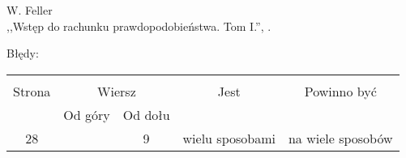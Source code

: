 \documentclass[a4paper,11pt]{article}
\begin{document}


\begin{center}
  W. Feller \\
  ,,Wstęp do rachunku prawdopodobieństwa. Tom I.'', \cite{Fel06}.
\end{center}

Błędy:\\
\begin{tabular}{|c|c|c|c|c|}
  \hline
  & \multicolumn{2}{c|}{} & & \\
  Strona & \multicolumn{2}{c|}{Wiersz} & Jest
                            & Powinno być \\ \cline{2-3}
  & Od góry & Od dołu & & \\
  \hline
  28 & & 9 & wielu sposobami & na wiele sposobów \\
  \hline
\end{tabular}




 {}




\end{document}
